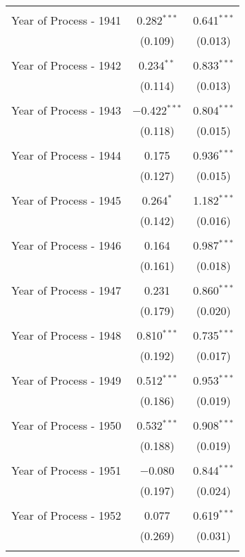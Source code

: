 \begin{table}[!htbp]
\begin{tabular}{@{\extracolsep{5pt}}lcc}
  & & \\ 
 Year of Process - 1941 & 0.282$^{***}$ & 0.641$^{***}$ \\ 
  & (0.109) & (0.013) \\ 
  & & \\ 
 Year of Process - 1942 & 0.234$^{**}$ & 0.833$^{***}$ \\ 
  & (0.114) & (0.013) \\ 
  & & \\ 
 Year of Process - 1943 & $-$0.422$^{***}$ & 0.804$^{***}$ \\ 
  & (0.118) & (0.015) \\ 
  & & \\ 
 Year of Process - 1944 & 0.175 & 0.936$^{***}$ \\ 
  & (0.127) & (0.015) \\ 
  & & \\ 
 Year of Process - 1945 & 0.264$^{*}$ & 1.182$^{***}$ \\ 
  & (0.142) & (0.016) \\ 
  & & \\ 
 Year of Process - 1946 & 0.164 & 0.987$^{***}$ \\ 
  & (0.161) & (0.018) \\ 
  & & \\ 
 Year of Process - 1947 & 0.231 & 0.860$^{***}$ \\ 
  & (0.179) & (0.020) \\ 
  & & \\ 
 Year of Process - 1948 & 0.810$^{***}$ & 0.735$^{***}$ \\ 
  & (0.192) & (0.017) \\ 
  & & \\ 
 Year of Process - 1949 & 0.512$^{***}$ & 0.953$^{***}$ \\ 
  & (0.186) & (0.019) \\ 
  & & \\ 
 Year of Process - 1950 & 0.532$^{***}$ & 0.908$^{***}$ \\ 
  & (0.188) & (0.019) \\ 
  & & \\ 
 Year of Process - 1951 & $-$0.080 & 0.844$^{***}$ \\ 
  & (0.197) & (0.024) \\ 
  & & \\ 
 Year of Process - 1952 & 0.077 & 0.619$^{***}$ \\ 
  & (0.269) & (0.031) \\ 
  & & \\ 

\end{tabular}
\end{table}
